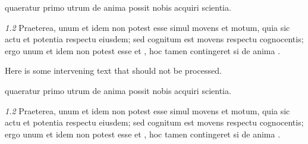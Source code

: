 \documentclass[a4paper, 12pt]{book}
\newcommand{\metatext}[1]{<#1>}
\newcommand{\no}[1]{\emph{#1}\quad}
\begin{document}
\begin{latin}
\beginnumbering

\pstart[\subsection*{\metatext{De scientia}}]
%
%
quaeratur
primo utrum de anima possit nobis acquiri scientia.
\pend

\pstart
{}%
\no{1.2}
Praeterea, unum et idem non potest esse simul movens et motum,
quia sic  actu et potentia respectu
eiusdem; sed cognitum est movens respectu cognocentis; ergo unum et idem non
potest esse  et
, hoc tamen
contingeret si de anima .
\pend

\endnumbering

Here is some intervening text that should not be processed.

\beginnumbering

\pstart[\subsection*{\metatext{De scientia}}]
%
%
quaeratur
primo utrum de anima possit nobis acquiri scientia.
\pend

\pstart
{}%
\no{1.2}
Praeterea, unum et idem non potest esse simul movens et motum,
quia sic  actu et potentia respectu
eiusdem; sed cognitum est movens respectu cognocentis; ergo unum et idem non
potest esse  et
, hoc tamen
contingeret si de anima .
\pend


\end{latin}
\end{document}
